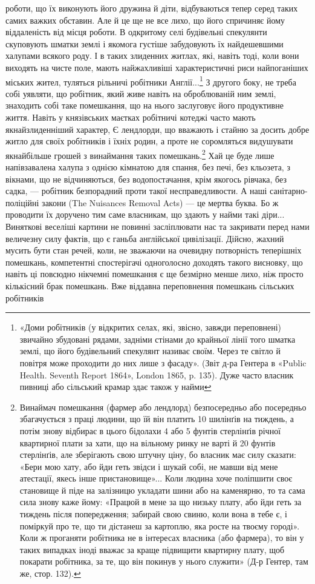 роботи, що їх виконують його дружина й діти, відбуваються
тепер серед таких самих важких обставин. Але й це ще не все
лихо, що його спричиняє йому віддаленість від місця роботи.
В одкритому селі будівельні спекулянти скуповують шматки землі
і якомога густіше забудовують їх найдешевшими халупами
всякого роду. І в таких злиденних житлах, які, навіть тоді,
коли вони виходять на чисте поле, мають найжахливіші характеристичні
риси найпоганіших міських жител, туляться рільничі
робітники Англії...\footnote{
«Доми робітників (у відкритих селах, які, звісно, завжди переповнені)
звичайно збудовані рядами, задніми стінами до крайньої лінії
того шматка землі, що його будівельний спекулянт називає своїм. Через
те світло й повітря може проходити до них лише з фасаду». (Звіт д-ра
Гентера в «Public Health. Seventh Report 1864», London 1865, p. 135).
Дуже часто власник пивниці або сільський крамар здає також у найми
} З другого боку, не треба собі уявляти,
що робітник, який живе навіть на оброблюваній ним землі, знаходить
собі таке помешкання, що на нього заслуговує його продуктивне
життя. Навіть у князівських маєтках робітничі котеджі
часто мають якнайзлиденніший характер, Є лендлорди, що вважають
і стайню за досить добре житло для своїх робітників
і їхніх родин, а проте не соромляться видушувати якнайбільше
грошей з винаймання таких помешкань.\footnote{
Винаймач помешкання (фармер або лендлорд) безпосередньо або
посередньо збагачується з праці людини, що їй він платить 10 шилінґів
на тиждень, а потім знову відбирає в цього бідолахи 4 або 5 фунтів
стерлінґів річної квартирної плати за хати, що на вільному ринку не
варті й 20 фунтів стерлінґів, але зберігають свою штучну ціну, бо власник
має силу сказати: «Бери мою хату, або йди геть звідси і шукай собі,
не мавши від мене атестації, якесь інше пристановище»... Коли людина
хоче поліпшити своє становище й піде на залізницю укладати шини або
на каменярню, то та сама сила знову каже йому: «Працюй в мене за що
низьку плату, або йди геть за тиждень після попередження; забирай свою
свиню, коли вона в тебе є, і поміркуй про те, що ти дістанеш за картоплю,
яка росте на твоєму городі». Коли ж проганяти робітника не в інтересах
власника (або фармера), то він у таких випадках іноді вважає за краще
підвищити квартирну плату, щоб покарати робітника, за те, що він
покинув у нього служити» (Д-р Гентер, там же, стор. 132).
} Хай це буде лише
напівзавалена халупа з однією кімнатою для спання, без печі,
без кльозета, з вікнами, що не відчиняються, без водопостачання,
крім якогось рівчака, без садка, — робітник безпорадний проти
такої несправедливости. А наші санітарно-поліційні закони
(The Nuisances Removal Acts) — це мертва буква. Бо ж проводити
їх доручено тим саме власникам, що здають у найми
такі діри... Виняткові веселіші картини не повинні засліплювати
нас та закривати перед нами величезну силу фактів, що є ганьба
англійської цивілізації. Дійсно, жахний мусить бути стан речей,
коли, не зважаючи на очевидну потворність теперішніх
помешкань, компетентні спостерігачі одноголосно доходять такого
висновку, що навіть ці повсюдно нікчемні помешкання є ще
безмірно менше лихо, ніж просто кількісний брак помешкань.
Вже віддавна переповнення помешкань сільських робітників

